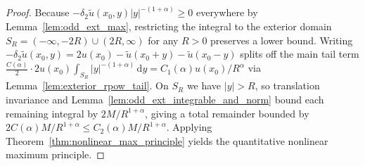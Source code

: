 \begin{proof}
\leanok
Because $-\delta_2 \widetilde{u}(x_0, y) \lvert y \rvert^{-(1 + \alpha)} \ge 0$ everywhere by Lemma~\ref{lem:odd_ext_max}, restricting the integral to the exterior domain $S_R = (-\infty, -2R) \cup (2R, \infty)$ for any $R > 0$ preserves a lower bound. Writing $-\delta_2 \widetilde{u}(x_0, y) = 2 u(x_0) - \widetilde{u}(x_0 + y) - \widetilde{u}(x_0 - y)$ splits off the main tail term $\frac{C(\alpha)}{2} \cdot 2 u(x_0) \int_{S_R} \lvert y \rvert^{-(1 + \alpha)}\, \mathrm{d}y = C_1(\alpha) u(x_0) / R^\alpha$ via Lemma~\ref{lem:exterior_rpow_tail}. On $S_R$ we have $\lvert y \rvert > R$, so translation invariance and Lemma~\ref{lem:odd_ext_integrable_and_norm} bound each remaining integral by $2M / R^{1 + \alpha}$, giving a total remainder bounded by $2 C(\alpha) M / R^{1 + \alpha} \le C_2(\alpha) M / R^{1 + \alpha}$. Applying Theorem~\ref{thm:nonlinear_max_principle} yields the quantitative nonlinear maximum principle.
\end{proof}
